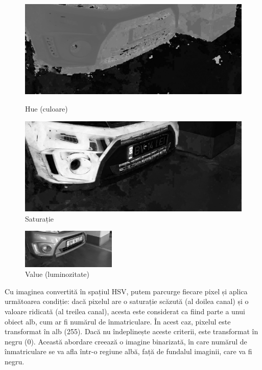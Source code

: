 \documentclass[a4paper,12pt]{report}
\begin{document}
\begin{figure}[h]
    \centering
    \begin{minipage}{0.4\textwidth}
        \centering
        \includegraphics[width=1\textwidth]{images/hue.jpg}
        \caption{Hue (culoare)}
    \end{minipage}
    \hspace{0.05\textwidth}
    \begin{minipage}{0.4\textwidth}
        \centering
        \includegraphics[width=1\textwidth]{images/saturation.jpg}
        \caption{Saturație}
    \end{minipage}
\end{figure}
\begin{figure}[h]
    \centering
    \includegraphics[width=0.4\textwidth]{images/value.jpg}
    \caption{Value (luminozitate)}
\end{figure}
\FloatBarrier

Cu imaginea convertită în spațiul HSV, putem parcurge fiecare pixel și aplica următoarea condiție: dacă pixelul are o saturație scăzută (al doilea canal) și o valoare ridicată (al treilea canal), acesta este considerat ca fiind parte a unui obiect alb, cum ar fi numărul de înmatriculare. În acest caz, pixelul este transformat în alb (255). Dacă nu îndeplinește aceste criterii, este transformat în negru (0). Această abordare creează o imagine binarizată, în care numărul de înmatriculare se va afla într-o regiune albă, față de fundalul imaginii, care va fi negru.
\end{document}
